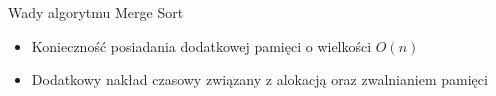 \begin{frame}[squeeze]{Wady algorytmu Merge Sort}
	
	\begin{itemize}
		\item Konieczność posiadania dodatkowej pamięci o wielkości $O(n)$
		\item Dodatkowy nakład czasowy związany z alokacją oraz zwalnianiem pamięci
	\end{itemize}

\end{frame}
